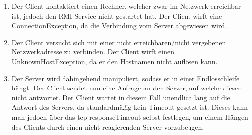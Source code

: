 \documentclass[german,12pt,a4paper]{article}
\begin{document}
\begin{enumerate}

	\item Der Client kontaktiert einen Rechner, welcher zwar im Netzwerk erreichbar ist, jedoch den RMI-Service nicht gestartet hat.
	Der Client wirft eine ConnectionException, da die Verbindung vom Server abgewiesen wird.
	 
	\item Der Client versucht sich mit einer nicht erreichbaren/nicht vergebenen Netzwerkadresse zu verbinden. 
	Der Client wirft einen UnknownHostException, da er den Hostnamen nicht auflösen kann.

	\item Der Server wird dahingehend manipuliert, sodass er in einer Endlosschleife hängt. Der Client sendet nun eine Anfrage an 
	den Server, auf welche dieser nicht antwortet. Der Client wartet in diesem Fall unendlich lang auf die Antwort des Servers, da standardmäßig 
	kein Timeout gesetzt ist. Dieses kann man jedoch über das tcp-responseTimeout selbst festlegen, um einem Hängen des Clients durch einen 
	nicht reagierenden Server vorzubeugen.
	
\end{enumerate}
\end{document}

